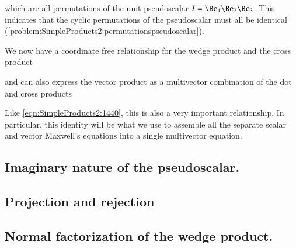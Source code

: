 which are all permutations of the  unit pseudoscalar \( I = \Be_1 \Be_2 \Be_3 \).
This indicates that the cyclic permutations of the  pseudoscalar must all be identical (\cref{problem:SimpleProducts2:permutationspseudoscalar}).

We now have a coordinate free relationship for the  wedge product and the cross product


and can also express the
 vector product as a multivector combination of the dot and cross products


Like
\cref{eqn:SimpleProducts2:1440}, this is also a very important relationship.
In particular, this identity will be what we use to assemble all the separate scalar and vector Maxwell's equations into a single multivector equation.




\subsection{Imaginary nature of the  pseudoscalar.}



\subsection{Projection and rejection}



\subsection{Normal factorization of the wedge product.}

